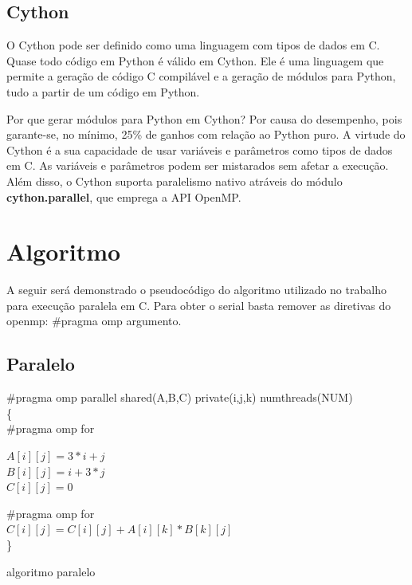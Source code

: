 \documentclass[a4paper,12pt]{article}
\begin{document}
\subsection{Cython}
O Cython pode ser definido como uma linguagem com tipos de dados em C. Quase todo código em Python é válido em Cython. Ele é uma linguagem que permite a geração de código C compilável e a geração de módulos para Python, tudo a partir de um código em Python. 

Por que gerar módulos para Python em Cython? Por causa do desempenho, pois garante-se, no mínimo, 25\% de ganhos com relação ao Python puro. A virtude do Cython é a sua capacidade de usar variáveis e parâmetros como tipos de dados em C. As variáveis e parâmetros podem ser mistarados sem afetar a execução. Além disso, o Cython suporta paralelismo nativo atráveis do módulo {\bf cython.parallel}, que emprega a API OpenMP. 

\section{Algoritmo}
A seguir será demonstrado o pseudocódigo do algoritmo utilizado no trabalho para execução paralela em C. Para obter o serial basta remover as diretivas do openmp: \#pragma omp argumento. 

\subsection{Paralelo}
\begin{algorithm}[H]
   \SetAlgoLined   
   \Inicio
   { 
       \#pragma omp parallel shared(A,B,C) private(i,j,k) num\underline{\space}threads(NUM) \\
       \{\\
        \#pragma omp for\\
        {
            {
                $A[i][j] = 3 \ast  i +  j$\\
        				$B[i][j] = i +  3 \ast  j$\\
	    	    		$C[i][j] = 0$\\
            }  
            
            
        }
        
        \#pragma omp for\\
        {
            {
                {
                   $C[i][j] = C[i][j] + A[i][k] \ast  B[k][j]$\\
                }
            }
        }
      \}
    
   }
   \label{alg:MxM}
   \caption{algoritmo paralelo}
\end{algorithm}
\end{document}
